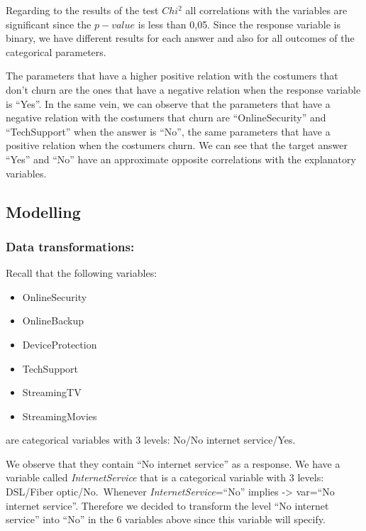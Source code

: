\documentclass[
  twoside]{article}
\begin{document}
Regarding to the results of the test \(Chi^2\) all correlations with the
variables are significant since the \(p-value\) is less than 0,05. Since
the response variable is binary, we have different results for each
answer and also for all outcomes of the categorical parameters.

The parameters that have a higher positive relation with the costumers
that don't churn are the ones that have a negative relation when the
response variable is ``Yes''. In the same vein, we can observe that the
parameters that have a negative relation with the costumers that churn
are ``OnlineSecurity'' and ``TechSupport'' when the answer is ``No'',
the same parameters that have a positive relation when the costumers
churn. We can see that the target answer ``Yes'' and ``No'' have an
approximate opposite correlations with the explanatory variables.

\hypertarget{modelling}{%
\subsection{Modelling}\label{modelling}}

\hypertarget{data-transformations}{%
\subsubsection{Data transformations:}\label{data-transformations}}

Recall that the following variables:

\begin{itemize}
\item OnlineSecurity
\item OnlineBackup
\item DeviceProtection
\item TechSupport
\item StreamingTV
\item StreamingMovies
\end{itemize}

are categorical variables with 3 levels: No/No internet service/Yes.

We observe that they contain ``No internet service'' as a response. We
have a variable called \emph{InternetService} that is a categorical
variable with 3 levels: DSL/Fiber optic/No.~Whenever
\emph{InternetService}=``No'' implies -\textgreater{} var=``No internet
service''. Therefore we decided to transform the level ``No internet
service'' into ``No'' in the 6 variables above since this variable will
specify.
\end{document}
